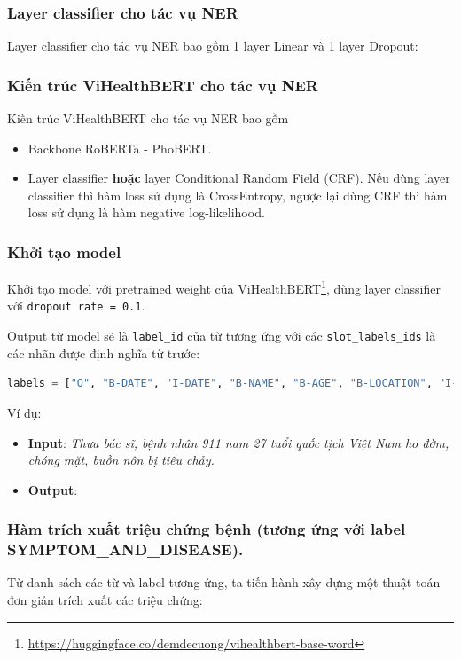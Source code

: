 \subsubsection{Layer classifier cho tác vụ NER}
Layer classifier cho tác vụ NER bao gồm 1 layer Linear và 1 layer Dropout:


\subsubsection{Kiến trúc ViHealthBERT cho tác vụ NER}
Kiến trúc ViHealthBERT cho tác vụ NER bao gồm 
\begin{itemize}
\item Backbone RoBERTa - PhoBERT.
\item Layer classifier \textbf{hoặc} layer Conditional Random Field (CRF). Nếu dùng layer classifier thì hàm loss sử dụng là CrossEntropy, ngược lại dùng CRF thì hàm loss sử dụng là hàm negative log-likelihood.
\end{itemize}



\subsubsection{Khởi tạo model}
Khởi tạo model với pretrained weight của ViHealthBERT\footnote{\href{https://huggingface.co/demdecuong/vihealthbert-base-word}{https://huggingface.co/demdecuong/vihealthbert-base-word}}, dùng layer classifier với \texttt{dropout rate = 0.1}.


Output từ model sẽ là \texttt{label\_id} của từ tương ứng với các \texttt{slot\_labels\_ids} là các nhãn được định nghĩa từ trước:
\begin{lstlisting}[language=Python]
labels = ["O", "B-DATE", "I-DATE", "B-NAME", "B-AGE", "B-LOCATION", "I-LOCATION", "B-JOB", "I-JOB","B-ORGANIZATION", "I-ORGANIZATION", "B-PATIENT_ID", "B-SYMPTOM_AND_DISEASE", "I-SYMPTOM_AND_DISEASE","B-GENDER", "B-TRANSPORTATION", "I-TRANSPORTATION", "I-NAME", "I-PATIENT_ID", "I-AGE", "I-GENDER"]
\end{lstlisting}
Ví dụ:
\begin{itemize}
\item \textbf{Input}: \textit{Thưa bác sĩ, bệnh nhân 911 nam 27 tuổi quốc tịch Việt Nam ho đờm, chóng mặt, buồn nôn bị tiêu chảy.}
\item \textbf{Output}:
\vietnameselst

\end{itemize}

\subsubsection{Hàm trích xuất triệu chứng bệnh (tương ứng với label \textbf{SYMPTOM\_AND\_DISEASE}).}
Từ danh sách các từ và label tương ứng, ta tiến hành xây dựng một thuật toán đơn giản trích xuất các triệu chứng:


